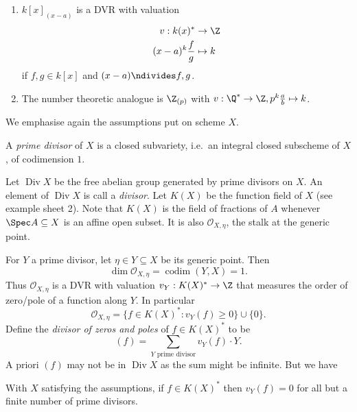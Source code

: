 \documentclass[a4paper]{article}
\newcommand{\sh}[1]{\mathcal{#1}} %
\DeclareMathOperator{\codim}{codim} %
\DeclareMathOperator{\Div}{Div} %
\begin{document}
\begin{eg}\leavevmode
  \begin{enumerate}
  \item \(k[x]_{(x - a)}\) is a DVR with valuation
    \begin{align*}
      v: k(x)^* &\to \Z \\
      (x - a)^k \frac{f}{g} &\mapsto k
    \end{align*}
    if \(f, g \in k[x]\) and \((x - a) \ndivides f, g\).
  \item The number theoretic analogue is \(\Z_{(p)}\) with \(v: \Q^* \to \Z, p^k \frac{a}{b} \mapsto k\).
  \end{enumerate}
\end{eg}

We emphasise again the assumptions put on scheme \(X\).

\begin{definition}
  A \emph{prime divisor} of \(X\) is a closed subvariety, i.e.\ an integral closed subscheme of \(X\), of codimension \(1\).
\end{definition}

Let \(\Div X\) be the free abelian group generated by prime divisors on \(X\). An element of \(\Div X\) is call a \emph{divisor}. Let \(K(X)\) be the function field of \(X\) (see example sheet 2). Note that \(K(X)\) is the field of fractions of \(A\) whenever \(\Spec A \subseteq X\) is an affine open subset. It is also \(\sh O_{X, \eta}\), the stalk at the generic point.

For \(Y\) a prime divisor, let \(\eta \in Y \subseteq X\) be its generic point. Then
\[
  \dim \sh O_{X, \eta} = \codim(Y, X) = 1.
\]
Thus \(\sh O_{X, \eta}\) is a DVR with valuation \(v_Y: K(X)^* \to \Z\) that measures the order of zero/pole of a function along \(Y\). In particular
\[
  \sh O_{X, \eta} = \{f \in K(X)^*: v_Y(f) \geq 0\} \cup \{0\}.
\]
Define the \emph{divisor of zeros and poles} of \(f \in K(X)^*\) to be
\[
  (f) = \sum_{Y \text{ prime divisor}} v_Y(f) \cdot Y.
\]
A priori \((f)\) may not be in \(\Div X\) as the sum might be infinite. But we have

\begin{lemma}
  With \(X\) satisfying the assumptions, if \(f \in K(X)^*\) then \(v_Y(f) = 0\) for all but a finite number of prime divisors.
\end{lemma}
\end{document}

